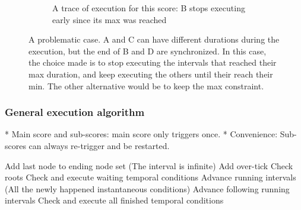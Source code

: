 \documentclass[applsci,article,submit,moreauthors,pdftex,10pt,a4paper]{mdpi}
\begin{document}
\begin{figure}
\begin{subfigure}{0.45\textwidth}
\caption{A trace of execution for this score: B stops executing early since its max was reached}
\end{subfigure}
\caption{A problematic case. A and C can have different durations during the execution, but the end of B and D are synchronized. In this case, the choice made is to stop executing the intervals that reached their max duration, and keep executing the others until their reach their min. The other alternative would be to keep the max constraint.}
\label{fig.maybe-incoherent}
\end{figure}


\subsubsection{General execution algorithm}

* Main score and sub-scores: main score only triggers once. 
* Convenience: Sub-scores can always re-trigger and be restarted.

\begin{algpseudocode}
\EndFunction
{}
  Add last node to ending node set
  \If(The interval is infinite)
    Add over-tick 
  \Else
  \Endif
\EndFunction
{}
  Check roots
  Check and execute waiting temporal conditions
  Advance running intervals
  \Do 
    \For(All the newly happened instantaneous conditions)
      Advance following running intervals
    Check and execute all finished temporal conditions
\EndFunction
\end{algpseudocode}
\end{document}
